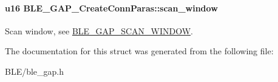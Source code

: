 \paragraph[{\texorpdfstring{scan\+\_\+window}{scan_window}}]{\setlength{\rightskip}{0pt plus 5cm}u16 B\+L\+E\+\_\+\+G\+A\+P\+\_\+\+Create\+Conn\+Paras\+::scan\+\_\+window}\hypertarget{struct_b_l_e___g_a_p___create_conn_paras_a8cd0f27ad3eec63e2843d362296376ce}{}\label{struct_b_l_e___g_a_p___create_conn_paras_a8cd0f27ad3eec63e2843d362296376ce}
Scan window, see \hyperlink{group___b_l_e___g_a_p___s_c_a_n___w_i_n_d_o_w}{B\+L\+E\+\_\+\+G\+A\+P\+\_\+\+S\+C\+A\+N\+\_\+\+W\+I\+N\+D\+OW}. 

The documentation for this struct was generated from the following file\+:\begin{DoxyCompactItemize}
\item 
B\+L\+E/ble\+\_\+gap.\+h\end{DoxyCompactItemize}
